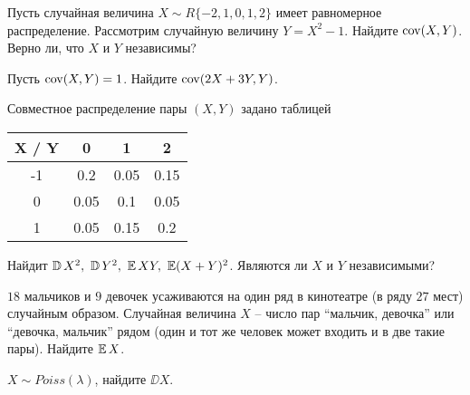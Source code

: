 \begin{problem}
    Пусть случайная величина $X \sim R\{-2, 1, 0, 1, 2\}$ имеет равномерное распределение.
    Рассмотрим случайную величину $Y = X^2 - 1$.
    Найдите $\operatorname{\mathrm{cov}}(X, Y)$.
    Верно ли, что $X$ и $Y$ независимы?
\end{problem}

\begin{problem}
    Пусть $\operatorname{\mathrm{cov}}(X, Y) = 1$.
    Найдите $\operatorname{\mathrm{cov}}(2X + 3Y, Y)$.
\end{problem}


\begin{problem}
    Совместное распределение пары $(X, Y)$ задано таблицей
    \begin{center}
    \begin{tabular}{c|c|c|c}
        X / Y & 0 & 1 & 2 \\
        \hline
        -1 & 0.2 & 0.05 & 0.15 \\
        \hline
        0 & 0.05 & 0.1 & 0.05 \\
        \hline
        1 & 0.05 & 0.15 & 0.2 \\
    \end{tabular}
    \end{center}
    Найдит $\operatorname{\mathbb{D}} X^2,\ \operatorname{\mathbb{D}} Y^2,\ \operatorname{\mathbb{E}} XY,\ \operatorname{\mathbb{E}} (X + Y)^2$.
    Являются ли $X$ и $Y$ независимыми?
\end{problem}

\begin{problem}
    $18$ мальчиков и $9$ девочек усаживаются на один ряд в кинотеатре (в ряду $27$ мест) случайным образом.
    Случайная величина $X$ -- число пар ``мальчик, девочка'' или ``девочка, мальчик'' рядом (один и тот же человек может входить и в две такие пары).
    Найдите $\operatorname{\mathbb{E}} X$.
\end{problem}

\begin{problem}
    $X \sim Poiss(\lambda)$, найдите $\DD X$.
\end{problem}

